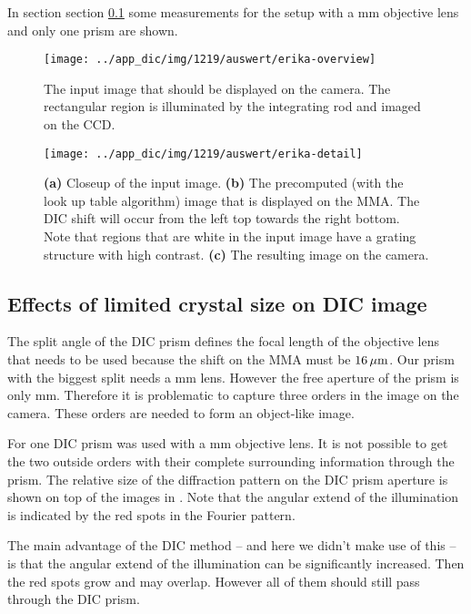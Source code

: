 In section section \ref{sec:size} some measurements for the setup with a
\unit[200]{mm} objective lens and only one prism are shown.
\begin{figure}[p]
  \centering
  \texttt{[image: ../app\_dic/img/1219/auswert/erika-overview]}
  \caption{The input image that should be displayed on the camera. The
    rectangular region is illuminated by the integrating rod and
    imaged on the CCD.}
  \label{fig:erika-overview}
\end{figure}

\begin{figure}[p]
  \centering
  \texttt{[image: ../app\_dic/img/1219/auswert/erika-detail]}
  \caption{{\bf (a)} Closeup of the input image. {\bf (b)} The
    precomputed (with the look up table algorithm) image that is
    displayed on the MMA. The DIC shift will occur from the left top
    towards the right bottom. Note that regions that are white in the
    input image have a grating structure with high contrast. {\bf (c)}
    The resulting image on the camera.}
  \label{fig:erika-detail}
\end{figure}
\newpage
\subsection{Effects of limited crystal size on DIC image}
\label{sec:size}
The split angle of the DIC prism defines the focal length of the
objective lens that needs to be used because the shift on the MMA must
be $\unit[16]{\mu m}$. Our prism with the biggest split needs a
\unit[200]{mm} lens. However the free aperture of the prism is only
\unit[10]{mm}. Therefore it is problematic to capture three orders in
the image on the camera. These orders are needed to form an
object-like image.

For  one DIC prism was used with a \unit[200]{mm}
objective lens. It is not possible to get the two outside orders with
their complete surrounding information through the prism. The relative
size of the diffraction pattern on the DIC prism aperture is shown on
top of the images in . Note that the angular extend
of the illumination is indicated by the red spots in the Fourier
pattern.

The main advantage of the DIC method -- and here we didn't make use of
this -- is that the angular extend of the illumination can be
significantly increased. Then the red spots grow and may
overlap. However all of them should still pass through the DIC prism.

